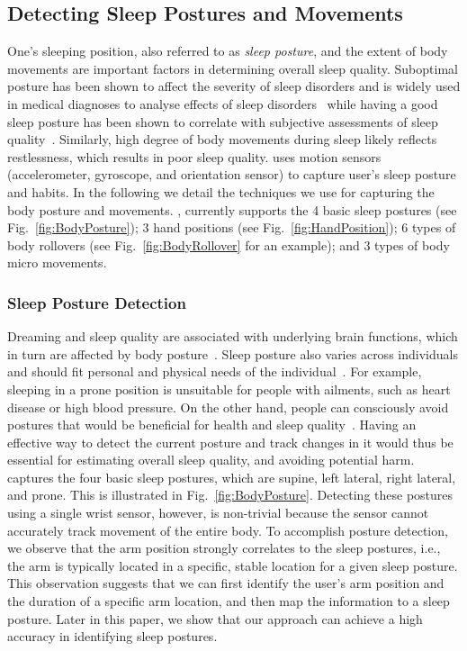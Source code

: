\subsection{Detecting Sleep Postures and Movements}

One's sleeping position, also referred to as {\em sleep posture}, and the extent of body movements are important factors in determining
overall sleep quality. Suboptimal posture has been shown to affect the severity of sleep disorders and is widely used in medical diagnoses
to analyse effects of sleep disorders~\cite{oksenberg1998effect,eiseman2012impact} while having a good sleep posture has been shown to
correlate with subjective assessments of sleep quality~\cite{dekoninck83sleep}. Similarly, high degree of body movements during sleep
likely reflects restlessness, which results in poor sleep quality. {\systemname} uses motion sensors (accelerometer, gyroscope, and
orientation sensor) to capture user's sleep posture and habits. In the following we detail the techniques we use for capturing the body
posture and movements.  {\systemname}, currently supports the 4 basic sleep postures (see Fig.~\ref{fig:BodyPosture}); 3 hand positions
(see Fig.~\ref{fig:HandPosition}); 6 types of body rollovers (see Fig.~\ref{fig:BodyRollover} for an example); and 3 types of body micro
movements. %


\subsubsection{Sleep Posture Detection \label{sec:sleeppdet}}

Dreaming and sleep quality are associated with underlying brain functions, which in turn are affected by body posture~\cite{posture2004}.
Sleep posture also varies across individuals and should fit personal and physical needs of the individual~\cite{posture2016,posture2017}.
For example, sleeping in a prone position is unsuitable for people with ailments, such as heart disease or high blood pressure. On the
other hand, people can consciously avoid postures that would be beneficial for health and sleep quality~\cite{posture2015}. Having an
effective way to detect the current posture and track changes in it would thus be essential for estimating overall sleep quality, and
avoiding potential harm. \systemname captures the four basic sleep postures, which are supine, left lateral, right lateral, and prone. This
is illustrated in Fig.~\ref{fig:BodyPosture}. Detecting these postures using a single wrist sensor, however, is non-trivial because the
sensor cannot accurately track movement of the entire body. To accomplish posture detection, we observe that the arm position strongly correlates to the sleep postures, i.e.,
the arm is typically located in a specific, stable location for a given sleep posture. This observation suggests that we can first identify
the user's arm position and the duration of a specific arm location, and then map the information to a sleep posture. Later in this paper,
we show that our approach can achieve a high accuracy in identifying sleep postures.




